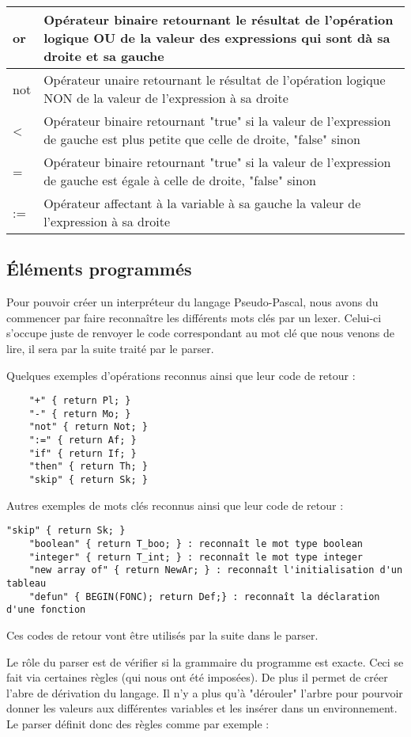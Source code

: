 \documentclass{article}
\begin{document}
\begin{tabular}{|p{2cm}|p{11cm}|}
  or & Opérateur binaire retournant le résultat de l'opération logique OU de la valeur des expressions qui sont dà sa droite et sa gauche\\ \hline
  not & Opérateur unaire retournant le résultat de l'opération logique NON de la valeur de l'expression à sa droite \\ \hline
  < & Opérateur binaire retournant "true" si la valeur de l'expression de gauche est plus petite que celle de droite, "false" sinon\\ \hline
  = & Opérateur binaire retournant "true" si la valeur de l'expression de gauche est égale à celle de droite, "false" sinon\\ \hline
  := & Opérateur affectant à la variable à sa gauche la valeur de l'expression à sa droite \\ \hline
\end{tabular}



\subsection{Éléments programmés}

Pour pouvoir créer un interpréteur du langage Pseudo-Pascal, nous avons du commencer par faire reconnaître les différents mots clés par un lexer. Celui-ci s'occupe juste de renvoyer le code correspondant au mot clé que nous venons de lire, il sera par la suite traité par le parser.

Quelques exemples d'opérations reconnus ainsi que leur code de retour :
\begin{lstlisting}
    "+" { return Pl; }
    "-" { return Mo; }
    "not" { return Not; }
    ":=" { return Af; }
    "if" { return If; }
    "then" { return Th; }
    "skip" { return Sk; }
\end{lstlisting}

Autres exemples de mots clés reconnus ainsi que leur code de retour :
\begin{lstlisting}
"skip" { return Sk; }
    "boolean" { return T_boo; } : reconnaît le mot type boolean
    "integer" { return T_int; } : reconnaît le mot type integer
    "new array of" { return NewAr; } : reconnaît l'initialisation d'un tableau
    "defun" { BEGIN(FONC); return Def;} : reconnaît la déclaration d'une fonction
\end{lstlisting}

Ces codes de retour vont être utilisés par la suite dans le parser.

\smallbreak
Le rôle du parser est de vérifier si la grammaire du programme est exacte. Ceci se fait via certaines règles (qui nous ont été imposées). De plus il permet de créer l'abre de dérivation du langage. Il n'y a plus qu'à "dérouler" l'arbre pour pourvoir donner les valeurs aux différentes variables et les insérer dans un environnement.
Le parser définit donc des règles comme par exemple :
\end{document}
